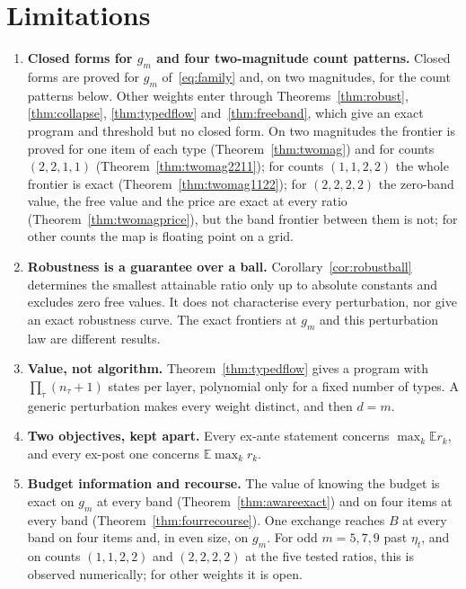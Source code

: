 \section{Limitations}
\label{sec:limits}

\begin{enumerate}
\item[1)] \textbf{Closed forms for $g_m$ and four two-magnitude count patterns.} Closed forms
are proved for $g_{m}$ of~\eqref{eq:family} and, on two magnitudes, for the count patterns
below. Other weights enter through Theorems~\ref{thm:robust}, \ref{thm:collapse},
\ref{thm:typedflow} and~\ref{thm:freeband}, which give an exact program and threshold but no
closed form. On two magnitudes the frontier is proved for one item of each
type (Theorem~\ref{thm:twomag}) and for counts $(2,2,1,1)$ (Theorem~\ref{thm:twomag2211}); for
counts $(1,1,2,2)$ the whole frontier is exact (Theorem~\ref{thm:twomag1122}); for $(2,2,2,2)$ the
zero-band value, the free value and the price are exact at every ratio
(Theorem~\ref{thm:twomagprice}), but the band frontier between them is not; for other counts the
map is floating point on a grid.
\item[2)] \textbf{Robustness is a guarantee over a ball.} Corollary~\ref{cor:robustball}
determines the smallest attainable ratio only up to absolute constants and excludes zero
free values. It does not characterise every perturbation, nor give an exact robustness curve.
The exact frontiers at $g_m$ and this perturbation law are different results.
\item[3)] \textbf{Value, not algorithm.} Theorem~\ref{thm:typedflow} gives a program with
$\prod_\tau(n_\tau+1)$ states per layer, polynomial only for a fixed number of types. A generic
perturbation makes every weight distinct, and then $d=m$.
\item[4)] \textbf{Two objectives, kept apart.} Every ex-ante statement concerns
$\max_{k}\mathbb{E}r_{k}$, and every ex-post one concerns $\mathbb{E}\max_{k}r_{k}$.
\item[5)] \textbf{Budget information and recourse.} The value of knowing the budget is exact on
$g_m$ at every band (Theorem~\ref{thm:awareexact}) and on four items at every band
(Theorem~\ref{thm:fourrecourse}). One exchange reaches $B$ at every band on four items and, in
even size, on $g_m$. For odd $m=5,7,9$ past $\eta_t$, and on counts $(1,1,2,2)$ and $(2,2,2,2)$ at
the five tested ratios, this is observed numerically; for other weights it is open.
\end{enumerate}

